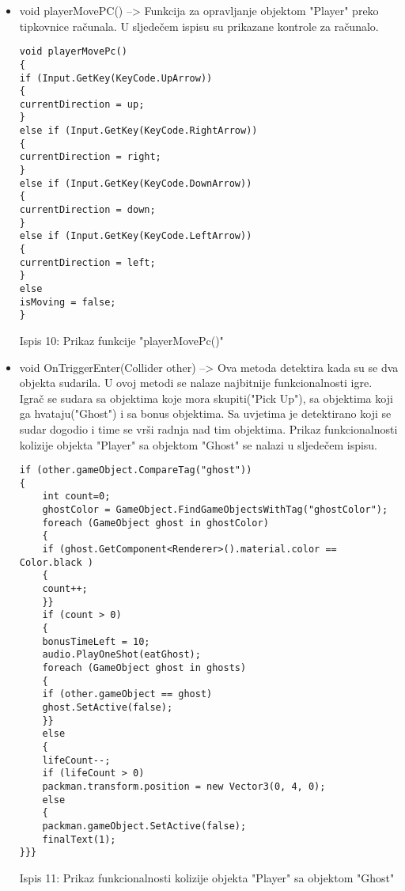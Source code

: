 \begin{itemize}
\item void playerMovePC() --> Funkcija za opravljanje objektom "Player" preko tipkovnice računala. U sljedečem ispisu su prikazane kontrole za računalo.
\begin{verbatim}
void playerMovePc()
{
if (Input.GetKey(KeyCode.UpArrow))
{
currentDirection = up;
}
else if (Input.GetKey(KeyCode.RightArrow))
{
currentDirection = right;
}
else if (Input.GetKey(KeyCode.DownArrow))
{
currentDirection = down;
}
else if (Input.GetKey(KeyCode.LeftArrow))
{
currentDirection = left;
}
else
isMoving = false;
}
\end{verbatim}
\begin{center}
	
	Ispis 10: Prikaz funkcije "playerMovePc()"
\end{center}
\item void OnTriggerEnter(Collider other) --> Ova metoda detektira kada su se dva objekta sudarila. U ovoj metodi se nalaze najbitnije funkcionalnosti igre. Igrač se sudara sa objektima koje mora skupiti("Pick Up"), sa objektima koji ga hvataju("Ghost") i sa bonus objektima. Sa uvjetima je detektirano koji se sudar dogodio i time se vrši radnja nad tim objektima. Prikaz funkcionalnosti kolizije objekta "Player" sa objektom "Ghost" se nalazi u sljedečem ispisu.

\newpage
\begin{verbatim}
if (other.gameObject.CompareTag("ghost"))
{
	int count=0;
	ghostColor = GameObject.FindGameObjectsWithTag("ghostColor");
	foreach (GameObject ghost in ghostColor)
	{
	if (ghost.GetComponent<Renderer>().material.color == Color.black )
	{
	count++;
	}}
	if (count > 0)
	{
	bonusTimeLeft = 10;
	audio.PlayOneShot(eatGhost);
	foreach (GameObject ghost in ghosts)
	{
	if (other.gameObject == ghost)
	ghost.SetActive(false);
	}}
	else
	{
	lifeCount--;
	if (lifeCount > 0)
	packman.transform.position = new Vector3(0, 4, 0);
	else
	{
	packman.gameObject.SetActive(false);
	finalText(1);
}}}
\end{verbatim}
\begin{center}
	
	Ispis 11: Prikaz funkcionalnosti kolizije objekta "Player" sa objektom "Ghost"
\end{center}
 
\end{itemize}




